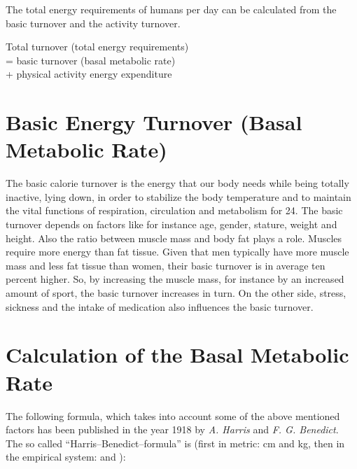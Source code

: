 \documentclass[../main.tex]{subfiles}
\begin{document}
The total energy requirements of humans per day can be calculated from the basic turnover and the activity turnover.

\vspace{2mm}

\begin{center}
\begin{fminipage}{7cm}
  Total turnover   (total energy requirements)\\
  = basic turnover (basal metabolic rate)\\
  + physical activity energy expenditure
\end{fminipage}
\end{center}

\vspace{2mm}

\section{Basic Energy Turnover (Basal Metabolic Rate)}

The basic calorie turnover is the energy that our body needs while being totally inactive, lying down, in order to
stabilize the body temperature and to maintain the vital functions of respiration, circulation and metabolism for \SI{24}{\hours}.
The basic turnover depends on factors like for instance age, gender, stature, weight and height.
Also the ratio between muscle mass and body fat plays a role.
Muscles require more energy than fat tissue.
Given that men typically have more muscle mass and less fat tissue than women, their basic turnover is in average ten percent higher.
So, by increasing the muscle mass, for instance by an increased amount of sport, the basic turnover increases in turn.
On the other side, stress, sickness and the intake of medication also influences the basic turnover.


\section{Calculation of the Basal Metabolic Rate}

The following formula, which takes into account some of the above mentioned factors has been published in the year 1918
by \textit{A. Harris} and \textit{F. G. Benedict}.
The so called ``Harris--Benedict--formula'' is (first in metric: \unit{\centi\meter} and \unit{\kilo\gram},
then in the empirical system: \unit{\lbs} and \unit{\in}):
\end{document}

